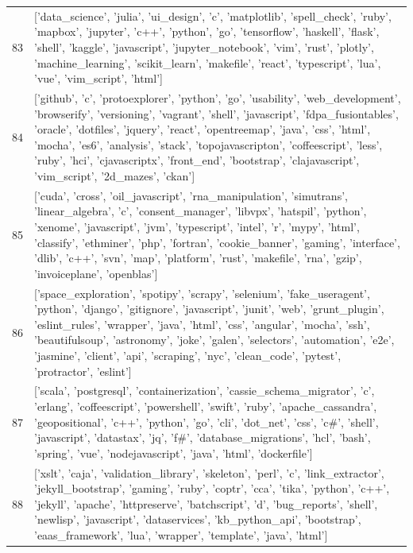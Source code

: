\begin{center}
\begin{longtable}{|p{1.5cm}|p{12.5cm}|}
            83 & ['data\_science', 'julia', 'ui\_design', 'c', 'matplotlib', 'spell\_check', 'ruby', 'mapbox', 'jupyter', 'c++', 'python', 'go', 'tensorflow', 'haskell', 'flask', 'shell', 'kaggle', 'javascript', 'jupyter\_notebook', 'vim', 'rust', 'plotly', 'machine\_learning', 'scikit\_learn', 'makefile', 'react', 'typescript', 'lua', 'vue', 'vim\_script', 'html']  \\ 
            84 & ['github', 'c', 'protoexplorer', 'python', 'go', 'usability', 'web\_development', 'browserify', 'versioning', 'vagrant', 'shell', 'javascript', 'fdpa\_fusiontables', 'oracle', 'dotfiles', 'jquery', 'react', 'opentreemap', 'java', 'css', 'html', 'mocha', 'es6', 'analysis', 'stack', 'topojavascripton', 'coffeescript', 'less', 'ruby', 'hci', 'cjavascriptx', 'front\_end', 'bootstrap', 'clajavascript', 'vim\_script', '2d\_mazes', 'ckan']  \\ 
            85 & ['cuda', 'cross', 'oil\_javascript', 'rna\_manipulation', 'simutrans', 'linear\_algebra', 'c', 'consent\_manager', 'libvpx', 'hatspil', 'python', 'xenome', 'javascript', 'jvm', 'typescript', 'intel', 'r', 'mypy', 'html', 'classify', 'ethminer', 'php', 'fortran', 'cookie\_banner', 'gaming', 'interface', 'dlib', 'c++', 'svn', 'map', 'platform', 'rust', 'makefile', 'rna', 'gzip', 'invoiceplane', 'openblas']  \\ 
            86 & ['space\_exploration', 'spotipy', 'scrapy', 'selenium', 'fake\_useragent', 'python', 'django', 'gitignore', 'javascript', 'junit', 'web', 'grunt\_plugin', 'eslint\_rules', 'wrapper', 'java', 'html', 'css', 'angular', 'mocha', 'ssh', 'beautifulsoup', 'astronomy', 'joke', 'galen', 'selectors', 'automation', 'e2e', 'jasmine', 'client', 'api', 'scraping', 'nyc', 'clean\_code', 'pytest', 'protractor', 'eslint']  \\ 
            87 & ['scala', 'postgresql', 'containerization', 'cassie\_schema\_migrator', 'c', 'erlang', 'coffeescript', 'powershell', 'swift', 'ruby', 'apache\_cassandra', 'geopositional', 'c++', 'python', 'go', 'cli', 'dot\_net', 'css', 'c\#', 'shell', 'javascript', 'datastax', 'jq', 'f\#', 'database\_migrations', 'hcl', 'bash', 'spring', 'vue', 'nodejavascript', 'java', 'html', 'dockerfile']  \\ 
            88 & ['xslt', 'caja', 'validation\_library', 'skeleton', 'perl', 'c', 'link\_extractor', 'jekyll\_bootstrap', 'gaming', 'ruby', 'coptr', 'cca', 'tika', 'python', 'c++', 'jekyll', 'apache', 'httpreserve', 'batchscript', 'd', 'bug\_reports', 'shell', 'newlisp', 'javascript', 'dataservices', 'kb\_python\_api', 'bootstrap', 'eaas\_framework', 'lua', 'wrapper', 'template', 'java', 'html']  \\ 

\end{longtable}
\end{center}
